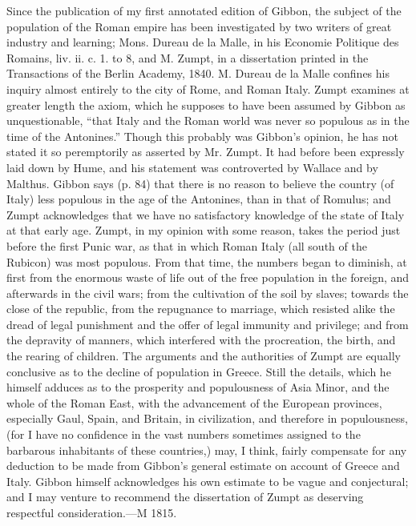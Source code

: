 {Since the publication of my first annotated edition of Gibbon,
the subject of the population of the Roman empire has been
investigated by two writers of great industry and learning; Mons.
Dureau de la Malle, in his Economie Politique des Romains, liv.
ii. c. 1. to 8, and M. Zumpt, in a dissertation printed in the
Transactions of the Berlin Academy, 1840. M. Dureau de la Malle
confines his inquiry almost entirely to the city of Rome, and
Roman Italy. Zumpt examines at greater length the axiom, which he
supposes to have been assumed by Gibbon as unquestionable, “that
Italy and the Roman world was never so populous as in the time of
the Antonines.” Though this probably was Gibbon’s opinion, he has
not stated it so peremptorily as asserted by Mr. Zumpt. It had
before been expressly laid down by Hume, and his statement was
controverted by Wallace and by Malthus. Gibbon says (p. 84) that
there is no reason to believe the country (of Italy) less
populous in the age of the Antonines, than in that of Romulus;
and Zumpt acknowledges that we have no satisfactory knowledge of
the state of Italy at that early age. Zumpt, in my opinion with
some reason, takes the period just before the first Punic war, as
that in which Roman Italy (all south of the Rubicon) was most
populous. From that time, the numbers began to diminish, at first
from the enormous waste of life out of the free population in the
foreign, and afterwards in the civil wars; from the cultivation
of the soil by slaves; towards the close of the republic, from
the repugnance to marriage, which resisted alike the dread of
legal punishment and the offer of legal immunity and privilege;
and from the depravity of manners, which interfered with the
procreation, the birth, and the rearing of children. The
arguments and the authorities of Zumpt are equally conclusive as
to the decline of population in Greece. Still the details, which
he himself adduces as to the prosperity and populousness of Asia
Minor, and the whole of the Roman East, with the advancement of
the European provinces, especially Gaul, Spain, and Britain, in
civilization, and therefore in populousness, (for I have no
confidence in the vast numbers sometimes assigned to the
barbarous inhabitants of these countries,) may, I think, fairly
compensate for any deduction to be made from Gibbon’s general
estimate on account of Greece and Italy. Gibbon himself
acknowledges his own estimate to be vague and conjectural; and I
may venture to recommend the dissertation of Zumpt as deserving
respectful consideration.—M 1815.}

